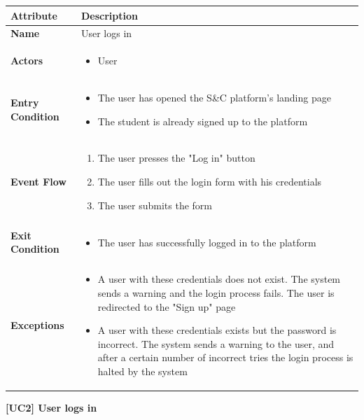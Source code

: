 \begin{center}
    
    \begin{tabular}{|p{3cm}|p{9cm}|}
    \hline
    \textbf{Attribute} & \textbf{Description} \\ \hline
    \textbf{Name} & User logs in \\ \hline
    \textbf{Actors} & 
    \begin{itemize}
        \item User
    \end{itemize} \\ \hline
    \textbf{Entry Condition} & 
    \begin{itemize}
        \item The user has opened the S\&C platform's landing page 
        \item The student is already signed up to the platform
    \end{itemize}\\ \hline
    \textbf{Event Flow} & 
    \begin{enumerate}
        \item The user presses the "Log in" button
        \item The user fills out the login form with his credentials
        \item The user submits the form
    \end{enumerate} \\ \hline
    \textbf{Exit Condition} & 
    \begin{itemize}
        \item The user has successfully logged in to the platform 
    \end{itemize}\\ \hline
    \textbf{Exceptions} & 
    \begin{itemize}
        \item [4a.] A user with these credentials does not exist. The system sends a warning and the login process fails. The user is redirected to the "Sign up" page
        \item [4b.] A user with these credentials exists but the password is incorrect. The system sends a warning to the user, and after a certain number of incorrect tries the login process is halted by the system 
    \end{itemize} \\ \hline
    \end{tabular}
    \newline
    \newline
    \textbf{[UC2] User logs in}
    \newline
    \newline


\end{center}
